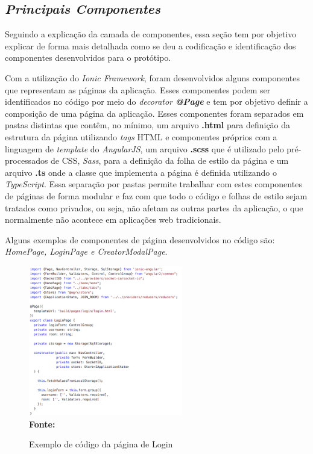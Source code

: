 \subsection{{\it Principais Componentes}}
Seguindo a explicação da camada de componentes, essa seção tem por objetivo explicar de forma mais detalhada como se deu a codificação e identificação dos componentes desenvolvidos para o protótipo.

Com a utilização do\textit{ Ionic Framework}, foram desenvolvidos alguns componentes que representam as páginas da aplicação. Esses componentes podem ser identificados no código por meio do \textit{decorator \textbf{@Page}} e tem por objetivo definir a composição de uma página da aplicação. Esses componentes foram separados em pastas distintas que contêm, no mínimo, um arquivo \textbf{.html} para definição da estrutura da página utilizando \textit{tags} HTML e componentes próprios com a linguagem de \textit{template} do \textit{AngularJS}, um arquivo \textbf{.scss} que é utilizado pelo pré-processados de CSS, \textit{Sass}, para a definição da folha de estilo da página e um arquivo \textbf{.ts} onde a classe que implementa a página é definida utilizando o \textit{TypeScript}. Essa separação por pastas permite trabalhar com estes componentes de páginas de forma modular e faz com que todo o código e folhas de estilo sejam tratados como privados, ou seja, não afetam as outras partes da aplicação, o que normalmente não acontece em aplicações web tradicionais.

Alguns exemplos de componentes de página desenvolvidos no código são: \textit{HomePage, LoginPage e CreatorModalPage}.

\begin{figure}[ht]
	\centering	
	\caption[\hspace{0.1cm}Exemplo de código da página de Login.]{Exemplo de código da página de Login}
	\vspace{-0.4cm}
	\includegraphics[width=0.6\textwidth]{figuras/CodigoLogin.png}
	\vspace{-0.2cm}
	\\\textbf{\footnotesize Fonte: \cite{pressman2011} }
	\label{fig:figura3}
\end{figure}
\vspace{-0.5cm}


